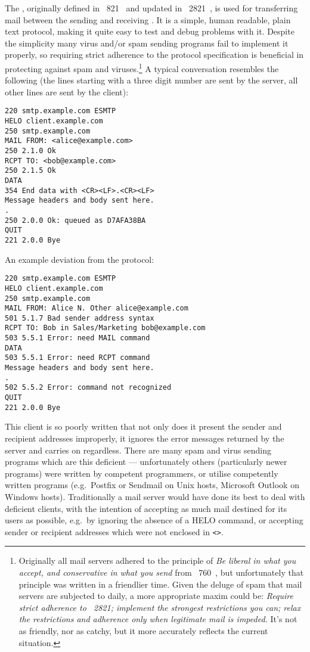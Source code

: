 \documentclass[a4paper,12pt,draft]{article}
\begin{document}
The \SMTPlong{}, originally defined in \RFC{}~821~\cite{RFC821} and updated
in \RFC{}~2821~\cite{RFC2821}, is used for transferring mail between the
sending and receiving \MTA{}\@.  It is a simple, human readable, plain text
protocol, making it quite easy to test and debug problems with it.  Despite
the simplicity many virus and/or spam sending programs fail to implement it
properly, so requiring strict adherence to the protocol specification is
beneficial in protecting against spam and
viruses.\footnote{\label{footnote:rfc760}Originally all mail servers
adhered to the principle of \textit{Be liberal in what you accept, and
conservative in what you send\/} from \RFC{}~760~\cite{rfc760}, but
unfortunately that principle was written in a friendlier time.  Given the
deluge of spam that mail servers are subjected to daily, a more appropriate
maxim could be: \textit{Require strict adherence to \RFC{}~2821; implement
the strongest restrictions you can; relax the restrictions and adherence
only when legitimate mail is impeded.\/}  It's not as friendly, nor as
catchy, but it more accurately reflects the current situation.} A typical
\SMTP{} conversation resembles the following (the lines starting with a
three digit number are sent by the server, all other lines are sent by the
client):

\begin{verbatim}
220 smtp.example.com ESMTP
HELO client.example.com
250 smtp.example.com
MAIL FROM: <alice@example.com>
250 2.1.0 Ok
RCPT TO: <bob@example.com>
250 2.1.5 Ok
DATA
354 End data with <CR><LF>.<CR><LF>
Message headers and body sent here.
.
250 2.0.0 Ok: queued as D7AFA38BA
QUIT
221 2.0.0 Bye
\end{verbatim}

An example deviation from the protocol:

\begin{verbatim}
220 smtp.example.com ESMTP
HELO client.example.com
250 smtp.example.com
MAIL FROM: Alice N. Other alice@example.com
501 5.1.7 Bad sender address syntax
RCPT TO: Bob in Sales/Marketing bob@example.com
503 5.5.1 Error: need MAIL command
DATA
503 5.5.1 Error: need RCPT command
Message headers and body sent here.
.
502 5.5.2 Error: command not recognized
QUIT
221 2.0.0 Bye
\end{verbatim}

This client is so poorly written that not only does it present the sender
and recipient addresses improperly, it ignores the error messages returned
by the server and carries on regardless.  There are many spam and virus
sending programs which are this deficient --- unfortunately others
(particularly newer programs) were written by competent programmers, or
utilise competently written programs (e.g.\ Postfix or Sendmail on Unix
hosts, Microsoft Outlook on Windows hosts).  Traditionally a mail server
would have done its best to deal with deficient clients, with the intention
of accepting as much mail destined for its users as
possible, e.g.\ by ignoring the absence of a HELO
command, or accepting sender or recipient addresses which were not enclosed
in \texttt{<>}.  
\end{document}
